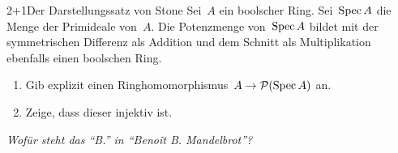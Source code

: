 \documentclass[entwurf]{uebblatt}
\begin{document}
\begin{aufgabe}{2+1}{Der Darstellungssatz von Stone}
Sei~$A$ ein boolscher Ring. Sei~$\operatorname{Spec} A$ die Menge der Primideale von~$A$. Die
Potenzmenge von~$\operatorname{Spec} A$ bildet mit der symmetrischen Differenz als Addition
und dem Schnitt als Multiplikation ebenfalls einen boolschen Ring.
\begin{enumerate}
\item Gib explizit einen Ringhomomorphismus~$A \to \mathcal{P}(\operatorname{Spec} A)$ an.
\item Zeige, dass dieser injektiv ist.
\end{enumerate}
\end{aufgabe}

\centering
\emph{Wofür steht das "`B."' in "`Benoît B. Mandelbrot"'?}
\par
\end{document}
